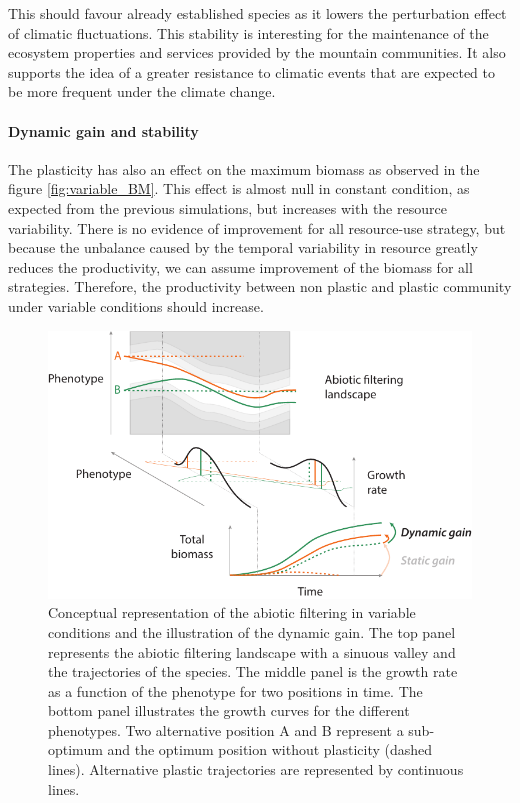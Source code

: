 This  should favour already established species as it lowers the perturbation effect of climatic fluctuations. This stability is interesting for the maintenance of the ecosystem properties and services provided by the mountain communities. It also supports the idea of a greater resistance to climatic events that are expected to be more frequent under the climate change. 


\paragraph{Dynamic gain and stability}

The plasticity has also an effect on the maximum biomass as observed in the figure \ref{fig:variable_BM}. This effect is almost null in constant condition, as expected from the previous simulations, but increases with the resource variability. There is no evidence of improvement for all resource-use strategy, but because the unbalance caused by the temporal variability in resource greatly reduces the productivity, we can assume improvement of the biomass for all strategies. Therefore, the productivity between non plastic and plastic community under variable conditions should increase.

\begin{figure}
\includegraphics[width = \textwidth]{./2_PP/Figures/Variable/variable_filter.pdf}
\caption[Abiotic filtering in temporally variable conditions]{Conceptual representation of the abiotic filtering in variable conditions and the illustration of the dynamic gain. The top panel represents the abiotic filtering landscape with a sinuous valley and the trajectories of the species. The middle panel is the growth rate as a function of the phenotype for two positions in time. The bottom panel illustrates the growth curves for the different phenotypes. Two alternative position \textcolor{myOrange}{A} and \textcolor{myGreen}{B} represent a sub-optimum and the optimum position without plasticity (dashed lines). Alternative plastic trajectories are represented by continuous lines.}\label{fig:variable_filter}
\end{figure}

